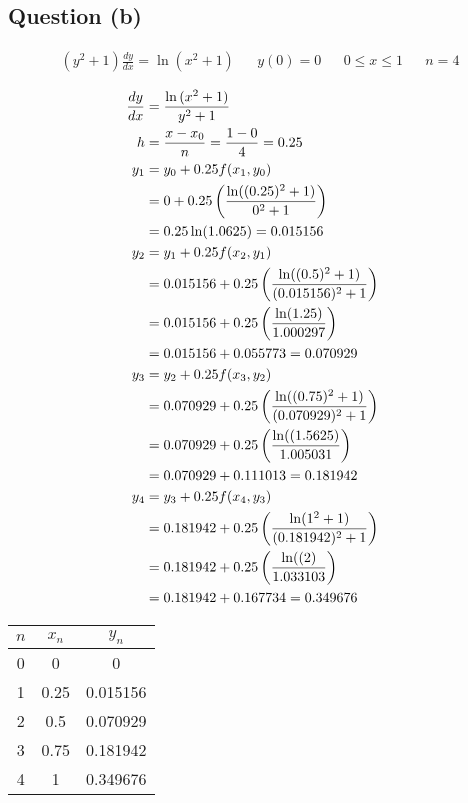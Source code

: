 	\subsection{Question (b)}
		\begin{align}
			&(y^{2}+1)\frac{dy}{dx} = \ln{(x^{2}+1)}&
			&y(0) = 0&
			&0 \leq x \leq 1&
			&n = 4&
		\end{align}

		\begin{align}
			\frac{dy}{dx} &= \frac{\ln{(x^{2}+1)}}{y^{2}+1}& \\
			h &= \frac{x - x_{0}}{n} = \frac{1 - 0}{4} = 0.25& \\
			y_{1} &= y_{0} + 0.25f(x_{1}, y_{0})& \\
			&= 0 + 0.25\left(\frac{\ln((0.25)^{2}+1)}{0^{2} + 1}\right)& \notag \\
			&= 0.25\ln(1.0625) = 0.015156& \\
			y_{2} &= y_{1} + 0.25f(x_{2}, y_{1})& \\
			&= 0.015156 + 0.25\left(\frac{\ln((0.5)^{2}+1)}{(0.015156)^{2} + 1}\right)& \notag \\
			&= 0.015156 + 0.25\left(\frac{\ln(1.25)}{1.000297}\right)& \notag \\
			&= 0.015156 + 0.055773 = 0.070929& \notag \\
			y_{3} &= y_{2} + 0.25f(x_{3}, y_{2})& \\
			&= 0.070929 + 0.25\left(\frac{\ln((0.75)^{2}+1)}{(0.070929)^{2} + 1}\right)& \notag \\
			&= 0.070929 + 0.25\left(\frac{\ln((1.5625)}{1.005031}\right)& \notag \\
			&= 0.070929 + 0.111013 = 0.181942& \\
			y_{4} &= y_{3} + 0.25f(x_{4}, y_{3})& \\
			&= 0.181942 + 0.25\left(\frac{\ln(1^{2}+1)}{(0.181942)^{2} + 1}\right)& \notag \\
			&= 0.181942 + 0.25\left(\frac{\ln((2)}{1.033103}\right)& \notag \\
			&= 0.181942 + 0.167734 = 0.349676&
		\end{align}

		\begin{table}[H]
			\centering
			\begin{tabular}{|c|c|c|}
				\hline
				$n$ & $x_{n}$ & $y_{n}$ \\ \hline
				0 & 0 & 0 \\ \hline
				1 & 0.25 & 0.015156 \\ \hline
				2 & 0.5 & 0.070929 \\ \hline
				3 & 0.75 & 0.181942 \\ \hline
				4 & 1 & 0.349676 \\ \hline
			\end{tabular}
		\end{table}
